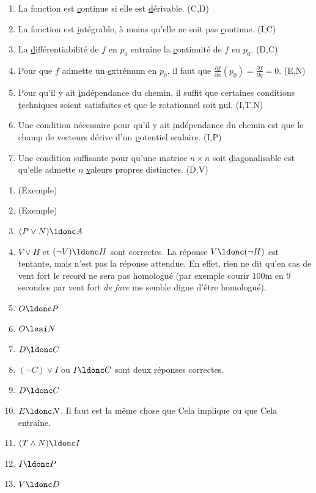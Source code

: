 \documentclass[12pt,french,oneside,a4paper]{memoir} %
\begin{document}
\begin{exo}
\begin{enumerate}
  \item La fonction est \underline{c}ontinue si elle est \underline{d}érivable. (C,D)

  \item La fonction est \underline{i}ntégrable, à moins qu'elle ne soit pas \underline{c}ontinue. (I,C)

  \item La \underline{d}ifférentiabilité de $f$ en $p_0$ entraîne la \underline{c}ontinuité de $f$ en $p_0$. (D,C)

  \item Pour que $f$ admette un \underline{e}xtrémum en $p_0$, il faut que $\displaystyle{\frac{\partial f}{\partial x}(p_0)=\frac{\partial f}{\partial y}=0 }$. (E,N)

  \item Pour qu'il y ait \underline{i}ndépendance du chemin, il suffit que certaines conditions \underline{t}echniques soient satisfaites et que le rotationnel soit \underline{n}ul. (I,T,N)

  \item Une condition nécessaire pour qu'il y ait \underline{i}ndépendance du chemin est que le champ de vecteurs dérive d'un \underline{p}otentiel scalaire. (I,P)

  \item Une condition suffisante pour qu'une matrice $n\times n$ soit \underline{d}iagonalisable est qu'elle admette $n$ \underline{v}aleurs propres distinctes. (D,V)
  \end{enumerate}
\begin{correction}
    \begin{enumerate}
    \item (Exemple)
    \item (Exemple)
    \item \((P \lor N) \ldonc A\)
    \item \(V \lor H\) et \((\lnot V) \ldonc H\) sont correctes. La réponse \(V \ldonc (\lnot H)\) est tentante, mais n'est pas la réponse attendue. En effet, rien ne dit qu'en cas de vent fort le record ne sera pas homologué (par exemple courir 100m en 9 secondes par vent fort \emph{de face} me semble digne d'être homologué).
    \item \(O \ldonc P\)
    \item \(O \lssi N\)
    \item \(D \ldonc C\)
    \item \((\lnot C) \lor I\) ou \(I \ldonc C\) sont deux réponses correctes.
    \item \(D \ldonc C\)
    \item \(E \ldonc N\). \og Il faut\fg{} est la même chose que \og Cela implique\fg{} ou que \og Cela entraîne\fg{}.
    \item \((T \land N) \ldonc I\)
    \item \(I \ldonc P\)
    \item \(V \ldonc D\)
    \end{enumerate}
\end{correction}
\end{exo}
\end{document}
